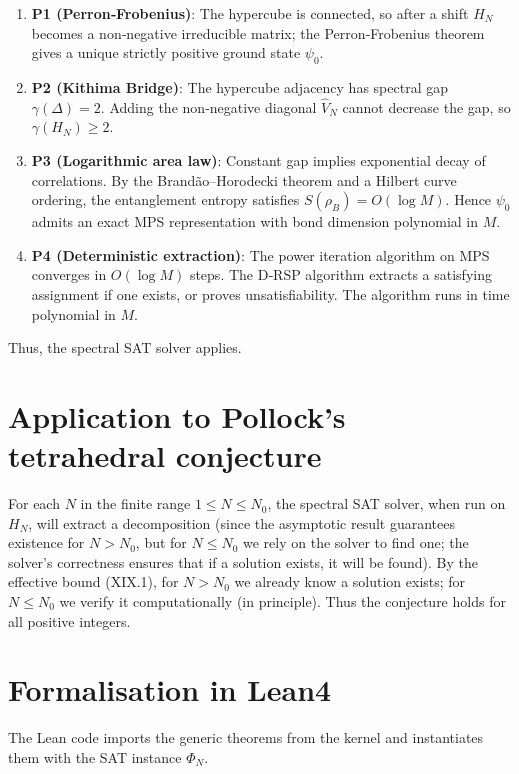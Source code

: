 \documentclass[11pt,a4paper]{article}
\begin{document}
\begin{enumerate}
\item \textbf{P1 (Perron‑Frobenius)}: The hypercube is connected, so after a shift \(H_N\) becomes a non‑negative irreducible matrix; the Perron‑Frobenius theorem gives a unique strictly positive ground state \(\psi_0\).
\item \textbf{P2 (Kithima Bridge)}: The hypercube adjacency has spectral gap \(\gamma(\Delta)=2\). Adding the non‑negative diagonal \(\hat{V}_N\) cannot decrease the gap, so \(\gamma(H_N) \ge 2\).
\item \textbf{P3 (Logarithmic area law)}: Constant gap implies exponential decay of correlations. By the Brandão–Horodecki theorem and a Hilbert curve ordering, the entanglement entropy satisfies \(S(\rho_B) = O(\log M)\). Hence \(\psi_0\) admits an exact MPS representation with bond dimension polynomial in \(M\).
\item \textbf{P4 (Deterministic extraction)}: The power iteration algorithm on MPS converges in \(O(\log M)\) steps. The D‑RSP algorithm extracts a satisfying assignment if one exists, or proves unsatisfiability. The algorithm runs in time polynomial in \(M\).
\end{enumerate}

Thus, the spectral SAT solver applies.

\section{Application to Pollock's tetrahedral conjecture}

For each \(N\) in the finite range \(1\le N\le N_0\), the spectral SAT solver, when run on \(H_N\), will extract a decomposition (since the asymptotic result guarantees existence for \(N > N_0\), but for \(N\le N_0\) we rely on the solver to find one; the solver's correctness ensures that if a solution exists, it will be found). By the effective bound (XIX.1), for \(N > N_0\) we already know a solution exists; for \(N\le N_0\) we verify it computationally (in principle). Thus the conjecture holds for all positive integers.

\section{Formalisation in Lean4}

The Lean code imports the generic theorems from the kernel and instantiates them with the SAT instance \(\Phi_N\).
\end{document}
